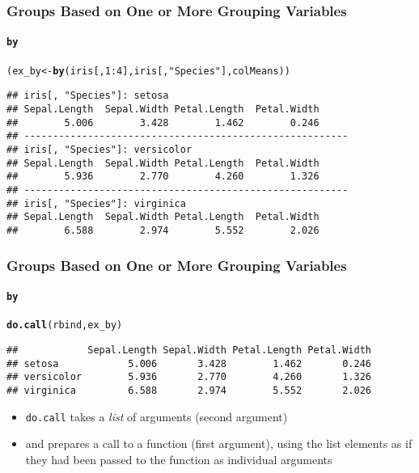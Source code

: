 \documentclass[paper=screen,mathserif]{beamer}\usepackage[]{graphicx}\usepackage[]{color}
\makeatletter
\newcommand{\hlnum}[1]{\textcolor[rgb]{0.686,0.059,0.569}{#1}}%
\newcommand{\hlstr}[1]{\textcolor[rgb]{0.192,0.494,0.8}{#1}}%
\newcommand{\hlopt}[1]{\textcolor[rgb]{0,0,0}{#1}}%
\newcommand{\hlstd}[1]{\textcolor[rgb]{0.345,0.345,0.345}{#1}}%
\newcommand{\hlkwb}[1]{\textcolor[rgb]{0.69,0.353,0.396}{#1}}%
\newcommand{\hlkwd}[1]{\textcolor[rgb]{0.737,0.353,0.396}{\textbf{#1}}}%
\newenvironment{kframe}{%
 \def\at@end@of@kframe{}%
 \ifinner\ifhmode%
  \def\at@end@of@kframe{\end{minipage}}%
  \begin{minipage}{\columnwidth}%
 \fi\fi%
 \def\FrameCommand##1{\hskip\@totalleftmargin \hskip-\fboxsep
 \colorbox{shadecolor}{##1}\hskip-\fboxsep
     \hskip-\linewidth \hskip-\@totalleftmargin \hskip\columnwidth}%
 \MakeFramed {\advance\hsize-\width
   \@totalleftmargin\z@ \linewidth\hsize
   \@setminipage}}%
 {\par\unskip\endMakeFramed%
 \at@end@of@kframe}
\newenvironment{knitrout}{}{} %
\newcommand{\ft}[1]{\frametitle{#1}}
\newcommand{\fst}[1]{\framesubtitle{#1}}
\makeatother
\begin{document}
\begin{frame}[fragile]
  \ft{Groups Based on One or More Grouping Variables}
  \fst{{\tt by}}
  
\begin{knitrout}\scriptsize
{}\color{fgcolor}\begin{kframe}
\begin{alltt}
\hlstd{(ex_by} \hlkwb{<-} \hlkwd{by}\hlstd{(iris[,} \hlnum{1}\hlopt{:}\hlnum{4}\hlstd{], iris[,} \hlstr{"Species"}\hlstd{], colMeans))}
\end{alltt}
\begin{verbatim}
## iris[, "Species"]: setosa
## Sepal.Length  Sepal.Width Petal.Length  Petal.Width 
##        5.006        3.428        1.462        0.246 
## -------------------------------------------------------- 
## iris[, "Species"]: versicolor
## Sepal.Length  Sepal.Width Petal.Length  Petal.Width 
##        5.936        2.770        4.260        1.326 
## -------------------------------------------------------- 
## iris[, "Species"]: virginica
## Sepal.Length  Sepal.Width Petal.Length  Petal.Width 
##        6.588        2.974        5.552        2.026
\end{verbatim}
\end{kframe}
\end{knitrout}
  
\end{frame}

\begin{frame}[fragile]
  \ft{Groups Based on One or More Grouping Variables}
  \fst{{\tt by}}

\begin{knitrout}\scriptsize
{}\color{fgcolor}\begin{kframe}
\begin{alltt}
\hlkwd{do.call}\hlstd{(rbind, ex_by)}
\end{alltt}
\begin{verbatim}
##            Sepal.Length Sepal.Width Petal.Length Petal.Width
## setosa            5.006       3.428        1.462       0.246
## versicolor        5.936       2.770        4.260       1.326
## virginica         6.588       2.974        5.552       2.026
\end{verbatim}
\end{kframe}
\end{knitrout}
\begin{itemize}
\item \verb=do.call= takes a {\em list} of arguments (second argument)
\item and prepares a call to a function (first argument), using the
  list elements as if they had been passed to the function as
  individual arguments 
\end{itemize}
\end{frame}
\end{document}
